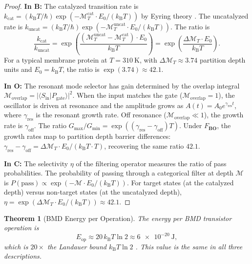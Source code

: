 \documentclass[twocolumn,10pt]{article}
\newtheorem{theorem}{Theorem}[section]
\theoremstyle{remark}
\newcommand{\kB}{k_{\mathrm{B}}}
\newcommand{\Depth}{\mathcal{M}}
\newcommand{\CatO}{\mathbf{O}}
\newcommand{\CatC}{\mathbf{C}}
\newcommand{\CatB}{\mathbf{B}}
\newcommand{\Fbo}{F_{\CatB\CatO}}
\begin{document}
\begin{proof}
\textbf{In $\CatB$:}
The catalyzed transition rate is $k_{\mathrm{cat}} = (\kB T/\hbar)\exp(-\Depth_T^{\mathrm{cat}}\cdot E_0/(\kB T))$ by Eyring theory \cite{eyring1935}.
The uncatalyzed rate is $k_{\mathrm{uncat}} = (\kB T/\hbar)\exp(-\Depth_T^{\mathrm{uncat}}\cdot E_0/(\kB T))$.
The ratio is
\begin{equation}
\frac{k_{\mathrm{cat}}}{k_{\mathrm{uncat}}} = \exp\!\left(\frac{(\Depth_T^{\mathrm{uncat}} - \Depth_T^{\mathrm{cat}})\cdot E_0}{\kB T}\right) = \exp\!\left(\frac{\Delta\Depth_T \cdot E_0}{\kB T}\right).
\end{equation}
For a typical membrane protein at $T = \SI{310}{\kelvin}$, with $\Delta\Depth_T \approx 3.74$ partition depth units and $E_0 = \kB T$, the ratio is $\exp(3.74) \approx 42.1$.

\textbf{In $\CatO$:}
The resonant mode selector has gain determined by the overlap integral $\mathcal{M}_{\mathrm{overlap}} = |\langle S_{\mathrm{in}}|P_{\mathrm{gate}}\rangle|^2$.
When the input matches the gate ($\mathcal{M}_{\mathrm{overlap}} = 1$), the oscillator is driven at resonance and the amplitude grows as $A(t) = A_0 e^{\gamma_{\mathrm{res}} t}$, where $\gamma_{\mathrm{res}}$ is the resonant growth rate.
Off resonance ($\mathcal{M}_{\mathrm{overlap}} \ll 1$), the growth rate is $\gamma_{\mathrm{off}}$.
The ratio $G_{\max}/G_{\min} = \exp((\gamma_{\mathrm{res}} - \gamma_{\mathrm{off}})T)$.
Under $\Fbo$, the growth rates map to partition depth barrier differences: $\gamma_{\mathrm{res}} - \gamma_{\mathrm{off}} = \Delta\Depth_T \cdot E_0/(\kB T \cdot T)$, recovering the same ratio $42.1$.

\textbf{In $\CatC$:}
The selectivity $\eta$ of the filtering operator measures the ratio of pass probabilities.
The probability of passing through a categorical filter at depth $\Depth$ is $P(\mathrm{pass}) \propto \exp(-\Depth \cdot E_0/(\kB T))$.
For target states (at the catalyzed depth) versus non-target states (at the uncatalyzed depth), $\eta = \exp(\Delta\Depth_T \cdot E_0/(\kB T)) \approx 42.1$.
\end{proof}

\begin{theorem}[BMD Energy per Operation]
\label{thm:bmd_energy}
The energy per BMD transistor operation is
\begin{equation}
E_{\mathrm{op}} \approx 20\,\kB T \ln 2 \approx \SI{6e-20}{\joule},
\label{eq:bmd_energy}
\end{equation}
which is $20\times$ the Landauer bound $\kB T \ln 2$ \cite{landauer1961}.
This value is the same in all three descriptions.
\end{theorem}
\end{document}
